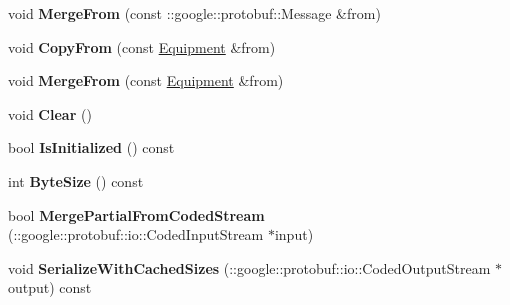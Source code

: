 \begin{DoxyCompactItemize}
\item 
\hypertarget{classexercise__protobuf_1_1_equipment_a6e4ae455cebc693ad0c1d39163929ab1}{}void {\bfseries Merge\+From} (const \+::google\+::protobuf\+::\+Message \&from)\label{classexercise__protobuf_1_1_equipment_a6e4ae455cebc693ad0c1d39163929ab1}

\item 
\hypertarget{classexercise__protobuf_1_1_equipment_a512c709e77a5f1d15426dd99e0ce4a9e}{}void {\bfseries Copy\+From} (const \hyperlink{classexercise__protobuf_1_1_equipment}{Equipment} \&from)\label{classexercise__protobuf_1_1_equipment_a512c709e77a5f1d15426dd99e0ce4a9e}

\item 
\hypertarget{classexercise__protobuf_1_1_equipment_a0c19672b9b434ac5c4da0b6aa60babec}{}void {\bfseries Merge\+From} (const \hyperlink{classexercise__protobuf_1_1_equipment}{Equipment} \&from)\label{classexercise__protobuf_1_1_equipment_a0c19672b9b434ac5c4da0b6aa60babec}

\item 
\hypertarget{classexercise__protobuf_1_1_equipment_a9d086db65d11324fd1591b532e3046ba}{}void {\bfseries Clear} ()\label{classexercise__protobuf_1_1_equipment_a9d086db65d11324fd1591b532e3046ba}

\item 
\hypertarget{classexercise__protobuf_1_1_equipment_ad1c0086ae587c1ec120aa3ee2ed24a26}{}bool {\bfseries Is\+Initialized} () const \label{classexercise__protobuf_1_1_equipment_ad1c0086ae587c1ec120aa3ee2ed24a26}

\item 
\hypertarget{classexercise__protobuf_1_1_equipment_a96fd0e95500177cd9da1e47fe30bec33}{}int {\bfseries Byte\+Size} () const \label{classexercise__protobuf_1_1_equipment_a96fd0e95500177cd9da1e47fe30bec33}

\item 
\hypertarget{classexercise__protobuf_1_1_equipment_ad9774ec88526a3f393566233b399ffab}{}bool {\bfseries Merge\+Partial\+From\+Coded\+Stream} (\+::google\+::protobuf\+::io\+::\+Coded\+Input\+Stream $\ast$input)\label{classexercise__protobuf_1_1_equipment_ad9774ec88526a3f393566233b399ffab}

\item 
\hypertarget{classexercise__protobuf_1_1_equipment_afcb7d68b3a7a3523f87a31833f235189}{}void {\bfseries Serialize\+With\+Cached\+Sizes} (\+::google\+::protobuf\+::io\+::\+Coded\+Output\+Stream $\ast$output) const \label{classexercise__protobuf_1_1_equipment_afcb7d68b3a7a3523f87a31833f235189}


\end{DoxyCompactItemize}
